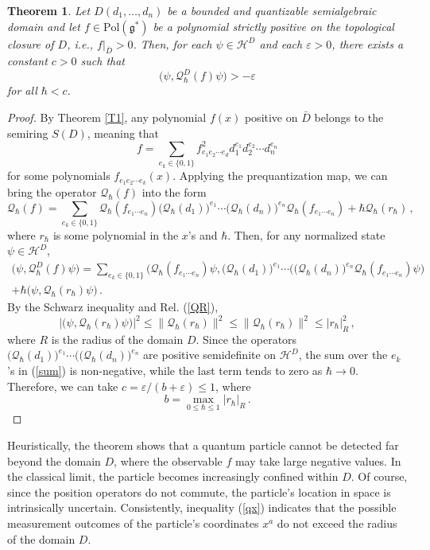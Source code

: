 \documentclass[12pt,a4paper]{article}
\numberwithin{equation}{section}
\theoremstyle{theorem}
\newtheorem{theorem}{Theorem}[]
\theoremstyle{remark}
\newcommand{\hh}{\mathcal{H}}
\newcommand{\gs}{\mathfrak{g}^\ast}
\newcommand{\qq}{\mathcal{Q}_{\hbar}}
\begin{document}
\begin{theorem}Let $D(d_1,\ldots,d_n)$ be a bounded and quantizable semialgebraic  domain and let $f\in \mathrm{Pol}(\gs)$ be a polynomial strictly positive on the topological closure of 
$D$, i.e., $f|_{\bar D}>0$.  Then, for each $\psi \in \hh^D$ and each $\varepsilon>0$, there exists a constant $c>0$ such  that 
   $$
   \big(\psi, \qq^D(f)\psi\big) >-\varepsilon 
   $$
   for all $\hbar<c$. 
\end{theorem}

\begin{proof}
By Theorem \ref{T1}, any polynomial $f(x)$ positive on $\bar D$ belongs to the semiring $S(D)$, meaning that 
\begin{equation}
    f=\sum_{e_k\in \{0,1\}} f^2_{e_1e_2\cdots e_d}d_1^{e_1}d_2^{e_2}\cdots d_n^{e_n}
\end{equation}
for some polynomials $f_{e_1e_2\cdots e_k}(x)$. Applying the prequantization map, we can bring the operator $\qq(f)$ into the form
$$
\qq(f)=\sum_{e_k\in \{0,1\}} \qq(f_{e_1\cdots e_n})\big(\qq(d_{1})\big)^{e_1}\cdots \big(\qq(d_n)\big)^{e_n}\qq(f_{e_1\cdots e_n})+\hbar \qq(r_\hbar)\,,
$$
where $r_\hbar$ is some polynomial in the $x$'s and $\hbar$. Then, for any normalized state $\psi\in \hh^D$,
\begin{equation}\label{sum}
\begin{array}{c}
  \displaystyle   \big(\psi, \qq^D(f)\psi\big)=\sum_{e_k\in \{0,1\}} \big(\qq(f_{e_1\cdots e_n})\psi, \big(\qq(d_1)\big)^{e_1}\cdots \big(\big(\qq(d_n)\big)^{e_n}\qq(f_{e_1\cdots e_n})\psi\big) \\[5mm]+\hbar \big(\psi, \qq(r_\hbar)\psi\big)\,.
    \end{array}
\end{equation}
By the Schwarz inequality and Rel. (\ref{QR}), 
\begin{equation}
    \big|\big(\psi,\qq(r_\hbar)\psi\big)\big|^2\leq \|\qq(r_\hbar)\|^2\leq \|\qq(r_\hbar)\|^2\leq |r_\hbar|^2_R\,,
\end{equation}
where $R$ is the radius of the domain $D$. Since the operators $\big(\qq(d_1)\big)^{e_1}\cdots \big(\big(\qq(d_n)\big)^{e_n}$ are positive semidefinite on $\hh^D$, the sum over the $e_k$'s in (\ref{sum}) is non-negative, while the last term tends to zero as $\hbar\rightarrow 0$. Therefore, we can take $c =\varepsilon/(b+\varepsilon) \leq 1$, where
$$
b=\max_{0\leq \hbar\leq 1}|r_\hbar|_R\,.
$$
\end{proof}

Heuristically, the theorem shows that a quantum particle cannot be detected far beyond the domain $D$, where the observable $f$ may take large negative values. In the classical limit, the particle becomes increasingly confined within
$D$. Of course, since the position operators do not commute, the particle's location in space is intrinsically uncertain. Consistently, inequality (\ref{qx}) indicates that the possible measurement outcomes of the particle’s coordinates 
$x^a$ do not exceed the radius of the domain $D$. 
\end{document}
